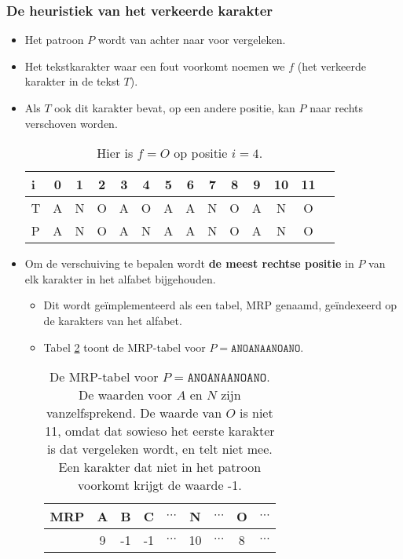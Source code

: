 \subsubsection{De heuristiek van het verkeerde karakter}
\begin{itemize}
    \item Het patroon $P$ wordt van achter naar voor vergeleken.
    \item Het tekstkarakter waar een fout voorkomt noemen we $f$ (het verkeerde karakter in de tekst $T$).
    \item Als $T$ ook dit karakter bevat, op een andere positie, kan $P$ naar rechts verschoven worden.
    \begin{table}[ht]
        \centering
        \begin{tabular}{l | c c c c c c c c c c c c c}
            i    & 0 & 1 & 2 & 3 & 4 & 5 & 6 & 7 & 8 & 9 & 10 & 11 & \\
            \hline
            T    & A & N & O & A & O & A & A & N & O & A & N  & O  & \\
            P    & A & N & O & A & N & A & A & N & O & A & N  & O  & \\
        \end{tabular}
        \caption{Hier is $f = O$ op positie $i = 4$.}
        \label{table:bm1}
    \end{table}
    \item Om de verschuiving te bepalen wordt \textbf{de meest rechtse positie} in $P$ van elk karakter in het alfabet bijgehouden.
    \begin{itemize}
        \item Dit wordt geïmplementeerd als een tabel, MRP genaamd, geïndexeerd op de karakters van het alfabet.
        \item Tabel \ref{table:bm2} toont de MRP-tabel voor $P = \texttt{ANOANAANOANO}$.
        \begin{table}[ht]
            \centering
            \begin{tabular}{l | cccccccc}
                MRP & A & B & C & $\cdots$ & N & $\cdots$ & O &  $\cdots$ \\
                \hline
                &     9 & -1 & -1 & $\cdots$ & 10 & $\cdots$ & 8 & $\cdots$  
            \end{tabular}
            \caption{De MRP-tabel voor $P = \texttt{ANOANAANOANO}$. De waarden voor $A$ en $N$ zijn vanzelfsprekend. De waarde van $O$ is niet 11, omdat dat sowieso het eerste karakter is dat vergeleken wordt, en telt niet mee. Een karakter dat niet in het patroon voorkomt krijgt de waarde -1.}
            \label{table:bm2}
        \end{table}


\end{itemize}
\end{itemize}
